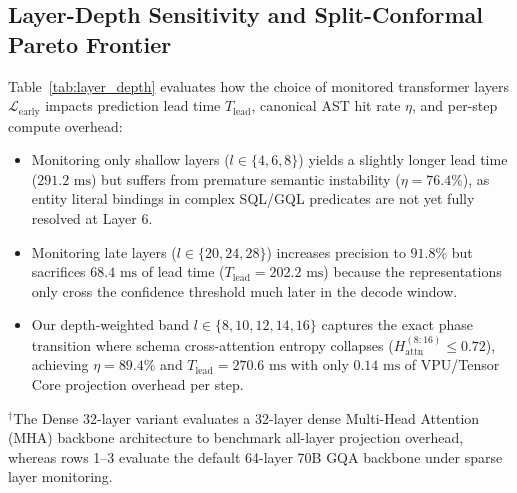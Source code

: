 \documentclass[10pt,conference]{IEEEtran}
\begin{document}
\subsection{Layer-Depth Sensitivity and Split-Conformal Pareto Frontier}
Table~\ref{tab:layer_depth} evaluates how the choice of monitored transformer layers $\mathcal{L}_{\text{early}}$ impacts prediction lead time $T_{\text{lead}}$, canonical AST hit rate $\eta$, and per-step compute overhead:
\begin{itemize}
    \item Monitoring only shallow layers ($l \in \{4, 6, 8\}$) yields a slightly longer lead time ($291.2\text{ ms}$) but suffers from premature semantic instability ($\eta = 76.4\%$), as entity literal bindings in complex SQL/GQL predicates are not yet fully resolved at Layer $6$.
    \item Monitoring late layers ($l \in \{20, 24, 28\}$) increases precision to $91.8\%$ but sacrifices $68.4\text{ ms}$ of lead time ($T_{\text{lead}} = 202.2\text{ ms}$) because the representations only cross the confidence threshold much later in the decode window.
    \item Our depth-weighted band $l \in \{8, 10, 12, 14, 16\}$ captures the exact phase transition where schema cross-attention entropy collapses ($H_{\text{attn}}^{(8:16)} \le 0.72$), achieving $\eta = 89.4\%$ and $T_{\text{lead}} = 270.6\text{ ms}$ with only $0.14\text{ ms}$ of VPU/Tensor Core projection overhead per step.
\end{itemize}

\begin{table}[t]
\centering
\footnotesize
\renewcommand{\arraystretch}{1.06}
\caption{Sensitivity to Monitored Early-Layer Band $\mathcal{L}_{\text{early}}$ Across $N = 750$ Idempotent Traces}
\label{tab:layer_depth}
\vspace*{1mm}
{\scriptsize $^\dagger$The Dense 32-layer variant evaluates a 32-layer dense Multi-Head Attention (MHA) backbone architecture to benchmark all-layer projection overhead, whereas rows 1--3 evaluate the default 64-layer 70B GQA backbone under sparse layer monitoring.}
\end{table}
\end{document}

